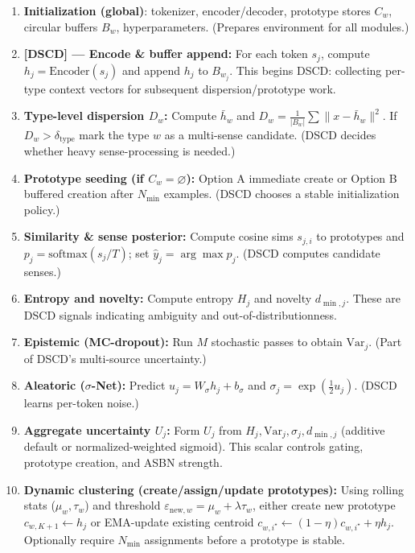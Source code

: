 \documentclass[11pt]{article}
\begin{document}
\begin{enumerate}
  \item \textbf{Initialization (global)}: tokenizer, encoder/decoder, prototype stores $C_w$, circular buffers $B_w$, hyperparameters. (Prepares environment for all modules.)
  
  \item \textbf{[DSCD] --- Encode \& buffer append:} For each token $s_j$, compute $h_j=\mathrm{Encoder}(s_j)$ and append $h_j$ to $B_{w_j}$. This begins DSCD: collecting per-type context vectors for subsequent dispersion/prototype work.
  
  \item \textbf{Type-level dispersion $D_w$:} Compute $\bar h_w$ and $D_w=\frac{1}{|B_w|}\sum\|x-\bar h_w\|^2$. If $D_w>\delta_{\text{type}}$ mark the type $w$ as a multi-sense candidate. (DSCD decides whether heavy sense-processing is needed.)
  
  \item \textbf{Prototype seeding (if $C_w=\varnothing$):} Option A immediate create or Option B buffered creation after $N_{\min}$ examples. (DSCD chooses a stable initialization policy.)
  
  \item \textbf{Similarity \& sense posterior:} Compute cosine sims $s_{j,i}$ to prototypes and $p_{j}=\mathrm{softmax}(s_j/T)$; set $\hat y_j=\arg\max p_j$. (DSCD computes candidate senses.)
  
  \item \textbf{Entropy and novelty:} Compute entropy $H_j$ and novelty $d_{\min,j}$. These are DSCD signals indicating ambiguity and out-of-distributionness.
  
  \item \textbf{Epistemic (MC-dropout):} Run $M$ stochastic passes to obtain $\mathrm{Var}_j$. (Part of DSCD's multi-source uncertainty.)
  
  \item \textbf{Aleatoric ($\sigma$-Net):} Predict $u_j=W_\sigma h_j+b_\sigma$ and $\sigma_j=\exp(\tfrac12u_j)$. (DSCD learns per-token noise.)
  
  \item \textbf{Aggregate uncertainty $U_j$:} Form $U_j$ from $H_j,\mathrm{Var}_j,\sigma_j,d_{\min,j}$ (additive default or normalized-weighted sigmoid). This scalar controls gating, prototype creation, and ASBN strength.
  
  \item \textbf{Dynamic clustering (create/assign/update prototypes):} Using rolling stats ($\mu_w,\tau_w$) and threshold $\varepsilon_{\text{new},w}=\mu_w+\lambda\tau_w$, either create new prototype $c_{w,K+1}\leftarrow h_j$ or EMA-update existing centroid $c_{w,i^\star}\leftarrow(1-\eta)c_{w,i^\star}+\eta h_j$. Optionally require $N_{\min}$ assignments before a prototype is stable.
  

\end{enumerate}
\end{document}
